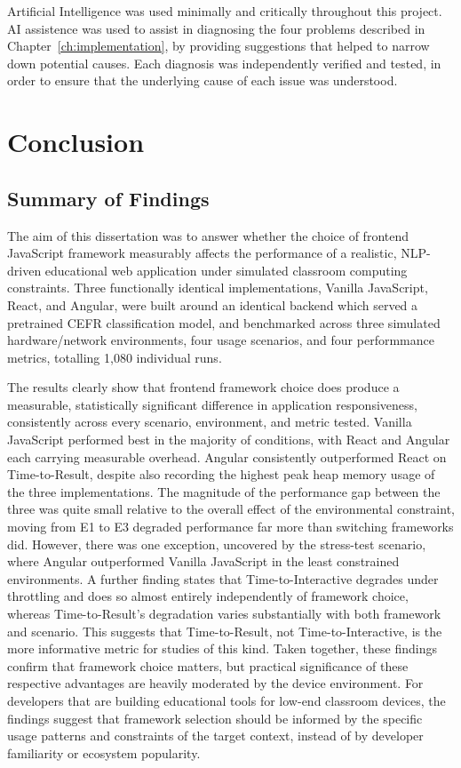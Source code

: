 \documentclass[11pt,a4paper]{report}
\begin{document}
Artificial Intelligence was used minimally and critically throughout this project. AI assistence was used to assist in diagnosing the four problems described in Chapter~\ref{ch:implementation}, by providing suggestions that helped to narrow down potential causes. Each diagnosis was independently verified and tested, in order to ensure that the underlying cause of each issue was understood. 
\chapter{Conclusion}
\label{ch:conclusion}

\section{Summary of Findings}

The aim of this dissertation was to answer whether the choice of frontend JavaScript framework measurably affects the performance of a realistic, NLP-driven educational web application under simulated classroom computing constraints. Three functionally identical implementations, Vanilla JavaScript, React, and Angular, were built around an identical backend which served a pretrained CEFR classification model, and benchmarked across three simulated hardware/network environments, four usage scenarios, and four performmance metrics, totalling 1,080 individual runs. 

\vspace{5mm}

The results clearly show that frontend framework choice does produce a measurable, statistically significant difference in application responsiveness, consistently across every scenario, environment, and metric tested. Vanilla JavaScript performed best in the majority of conditions, with React and Angular each carrying measurable overhead. Angular consistently outperformed React on Time-to-Result, despite also recording the highest peak heap memory usage of the three implementations. The magnitude of the performance gap between the three was quite small relative to the overall effect of the environmental constraint, moving from E1 to E3 degraded performance far more than switching frameworks did. However, there was one exception, uncovered by the stress-test scenario, where Angular outperformed Vanilla JavaScript in the least constrained environments. A further finding states that Time-to-Interactive degrades under throttling and does so almost entirely independently of framework choice, whereas Time-to-Result's degradation varies substantially with both framework and scenario. This suggests that Time-to-Result, not Time-to-Interactive, is the more informative metric for studies of this kind. Taken together, these findings confirm that framework choice matters, but practical significance of these respective advantages are heavily moderated by the device environment. For developers that are building educational tools for low-end classroom devices, the findings suggest that framework selection should be informed by the specific usage patterns and constraints of the target context, instead of by developer familiarity or ecosystem popularity.
\end{document}
